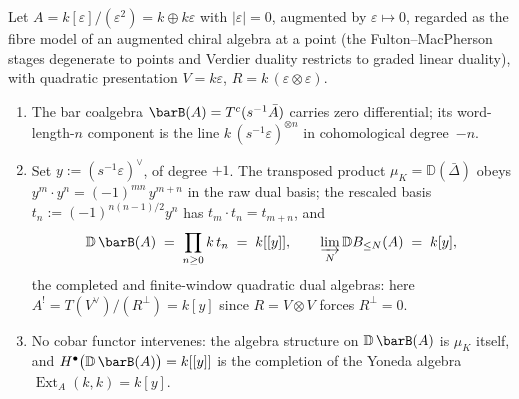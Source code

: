 \begin{lemma}\label{lem:verdier-bar-square-zero-toy}
Let $A=k[\varepsilon]/(\varepsilon^{2})=k\oplus k\varepsilon$ with
$|\varepsilon|=0$, augmented by $\varepsilon\mapsto0$, regarded as the
fibre model of an augmented chiral algebra at a point (the
Fulton--MacPherson stages degenerate to points and Verdier duality
restricts to graded linear duality), with quadratic presentation
$V=k\varepsilon$, $R=k\,(\varepsilon\otimes\varepsilon)$.
\begin{enumerate}[label=\textup{(\roman*)}]
\item The bar coalgebra $\barB(A)=T^{c}(s^{-1}\bar A)$ carries zero
differential; its word-length-$n$ component is the line
$k\,(s^{-1}\varepsilon)^{\otimes n}$ in cohomological degree~$-n$.
\item Set $y:=(s^{-1}\varepsilon)^{\vee}$, of degree $+1$. The
transposed product $\mu_{K}=\mathbb D(\bar\Delta)$ obeys
$y^{m}\cdot y^{n}=(-1)^{mn}\,y^{m+n}$ in the raw dual basis; the
rescaled basis $t_{n}:=(-1)^{n(n-1)/2}y^{n}$ has
$t_{m}\cdot t_{n}=t_{m+n}$, and
\[
\mathbb D\,\barB(A)\;=\;\prod_{n\geq0}k\,t_{n}\;=\;k[[y]],
\qquad
\varinjlim_{N}\mathbb D B_{\leq N}(A)\;=\;k[y],
\]
the completed and finite-window quadratic dual algebras: here
$A^{!}=T(V^{\vee})/(R^{\perp})=k[y]$ since $R=V\otimes V$ forces
$R^{\perp}=0$.
\item No cobar functor intervenes: the algebra structure on
$\mathbb D\,\barB(A)$ is $\mu_{K}$ itself, and
$H^{\bullet}\bigl(\mathbb D\,\barB(A)\bigr)=k[[y]]$ is the completion
of the Yoneda algebra $\operatorname{Ext}_{A}(k,k)=k[y]$.
\end{enumerate}
\end{lemma}

